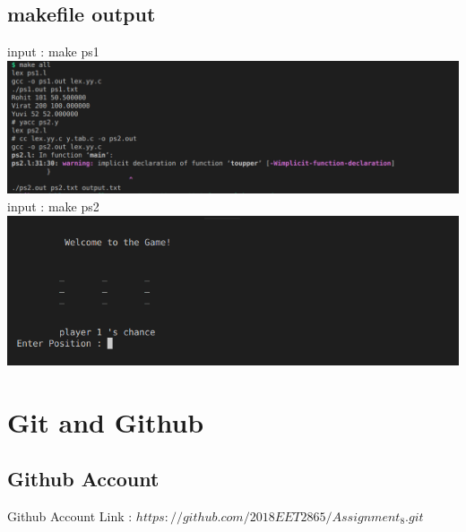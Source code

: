 \documentclass{article}
\begin{document}
    \subsection{makefile output}
    input : make ps1\\
    \includegraphics[width=1.2\textwidth]{./images/mk_001.png}
    input : make ps2\\
    \includegraphics[width=1.2\textwidth]{./images/mk_002.png}

    \newpage

    \section{Git and Github}
    \subsection{Github Account}
    Github Account Link : $https://github.com/2018EET2865/Assignment_8.git$
\end{document}

